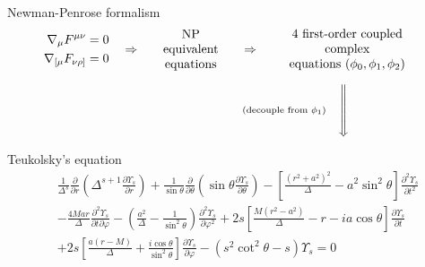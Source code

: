 \documentclass[9pt]{beamer}
\newcommand{\xDownarrow}[1]{%
	{\left\Downarrow\vbox to #1{}\right.\kern-\nulldelimiterspace}
}
\begin{document}
\begin{frame}[fragile]{Newman-Penrose formalism}
	\begin{equation*}
		\begin{aligned}
			\nabla_\mu F^{\mu\nu} = 0 \\
			\nabla_{[\mu} F_{\nu\rho]} = 0
		\end{aligned}
		\quad\Rightarrow\quad
		\parbox{2.1cm}{\centering NP equivalent\\equations }
		\quad\Rightarrow\quad
		\parbox{4.2cm}{\centering 4 first-order coupled complex\\equations $(\phi_0, \phi_1, \phi_2)$ }
	\end{equation*}

	\begin{equation*}
		\hspace*{3.5cm}\scriptstyle\text{(decouple from $\phi_1$)}\quad\xDownarrow{0.8cm}
	\end{equation*}
	\begin{block}{Teukolsky's equation}
		\begin{align*}
		& \frac{1}{\Delta^s} \frac{\partial}{\partial r} \left( \Delta^{s+1} \frac{\partial \Upsilon_s}{\partial r} \right) 
		+ \frac{1}{\sin\theta} \frac{\partial}{\partial\theta} \left( \sin\theta \frac{\partial \Upsilon_s}{\partial \theta} \right) 
		- \left[ \frac{(r^2+a^2)^2}{\Delta} - a^2 \sin^2\theta \right]\frac{\partial^2 \Upsilon_s}{\partial t^2} \\[0.15cm]
		& - \frac{4 M a r}{\Delta}\frac{\partial^2 \Upsilon_s}{\partial t \partial \varphi} 
		- \left( \frac{a^2}{\Delta} -\frac{1}{\sin^2\theta} \right)\frac{\partial^2 \Upsilon_s}{\partial \varphi^2} 
		+ 2s\left[ \frac{M(r^2-a^2)}{\Delta} - r - i a \cos\theta \right] \frac{\partial \Upsilon_s}{\partial t} \\[0.15cm]
		&+ 2s\left[ \frac{a(r-M)}{\Delta}+\frac{i \cos\theta}{\sin^2\theta}\right] \frac{\partial \Upsilon_s}{\partial \varphi}
		- (s^2 \cot^2\theta - s) \Upsilon_s = 0 
		\end{align*}
	\end{block}
	
\end{frame}
\end{document}
